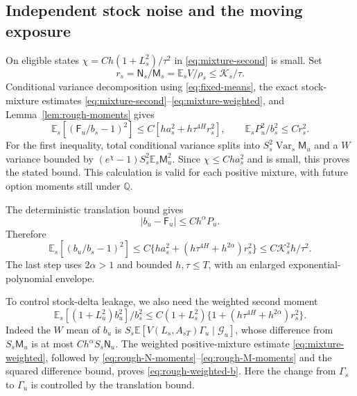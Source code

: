 \documentclass[11pt,a4paper]{amsart}
\theoremstyle{plain}
\theoremstyle{definition}
\theoremstyle{remark}
\DeclareMathOperator{\Var}{Var}
\newcommand{\EE}{\mathbb{E}}
\newcommand{\QQ}{\mathbb{Q}}
\newcommand{\G}{\mathcal G}
\newcommand{\Es}{\EE_s}
\begin{document}
\subsection{Independent stock noise and the moving exposure}
On eligible states $\chi=C h(1+L_s^2)/\tau^2$ in \eqref{eq:mixture-second} is small. Set
\begin{equation}\label{eq:rough-rs}
 r_s=\mathsf N_s/\mathsf M_s=\Es V/\rho_s\le\mathcal K_s/\tau.
\end{equation}
Conditional variance decomposition using \eqref{eq:fixed-means}, the exact stock-mixture estimates \eqref{eq:mixture-second}--\eqref{eq:mixture-weighted}, and Lemma~\ref{lem:rough-moments} gives
\begin{equation}\label{eq:rough-F-moments}
 \Es[(\mathsf F_u/b_s-1)^2]
 \le C[h a_s^2+h\tau^{4H}r_s^2],\qquad
 \Es P_u^2/b_s^2\le C r_s^2.
\end{equation}
For the first inequality, total conditional variance splits into
$S_s^2\Var_s\mathsf M_u$ and a $W$ variance bounded by
$(e^\chi-1)S_s^2\Es\mathsf M_u^2$. Since $\chi\le C h a_s^2$ and is small, this proves the stated bound. This calculation is valid for each positive mixture, with future option moments still under $\QQ$.

The deterministic translation bound gives
\begin{equation}\label{eq:rough-moving-exposure}
 |b_u-\mathsf F_u|\le C h^\alpha P_u.
\end{equation}
Therefore
\begin{equation}\label{eq:rough-b-variation}
 \Es[(b_u/b_s-1)^2]
 \le C\{h a_s^2+(h\tau^{4H}+h^{2\alpha})r_s^2\}
 \le C\mathcal K_s^2h/\tau^2.
\end{equation}
The last step uses $2\alpha>1$ and bounded $h,\tau\le T$, with an enlarged exponential-polynomial envelope.

To control stock-delta leakage, we also need the weighted second moment
\begin{equation}\label{eq:rough-weighted-b}
 \Es[(1+L_u^2)b_u^2]/b_s^2
 \le C(1+L_s^2)\{1+(h\tau^{4H}+h^{2\alpha})r_s^2\}.
\end{equation}
Indeed the $W$ mean of $b_u$ is
$S_s\EE[V(L_s,A_{sT})\Gamma_u\mid\G_u]$, whose difference from $S_s\mathsf M_u$ is at most $C h^\alpha S_s\mathsf N_u$. The weighted positive-mixture estimate \eqref{eq:mixture-weighted}, followed by \eqref{eq:rough-N-moments}--\eqref{eq:rough-M-moments} and the squared difference bound, proves \eqref{eq:rough-weighted-b}. Here the change from $\Gamma_s$ to $\Gamma_u$ is controlled by the translation bound.
\end{document}
